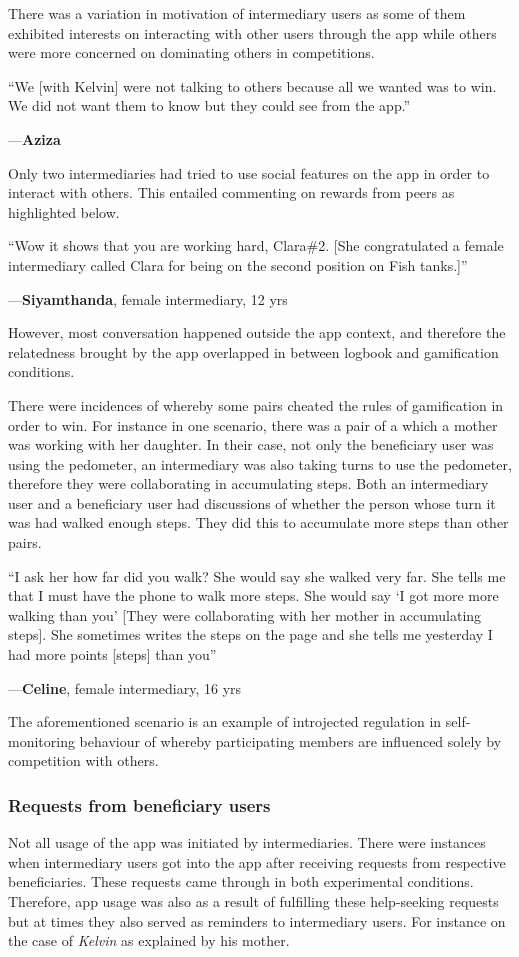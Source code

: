 \documentclass{sig-alternate}
\newenvironment{myquote}
               {\list{}{\rightmargin   \leftmargin
                        \parsep        0in }%
                \item\relax}
               {\endlist}
\newcommand{\userquote}[2]{\begin{samepage}\begin{myquote} 
     \em{\small{#2\begin{flushright}---#1\end{flushright}}}
   \end{myquote}\end{samepage}}
\begin{document}
There was a variation in motivation of intermediary users as some of them exhibited interests on interacting with other users through the app while others were more concerned on dominating others in competitions.

\userquote{\textbf{Aziza}} {``We [with Kelvin] were not talking to others because all we wanted was to win. We did not want them to know but they could see from the app.''}
 
Only two intermediaries had tried to use social features on the app in order to interact with others. This entailed commenting on rewards from peers as highlighted below.


\userquote{\textbf{Siyamthanda}, female intermediary, 12 yrs } {``Wow it shows that you are working hard, Clara\#2. [She congratulated a female intermediary called Clara for being on the second position on Fish tanks.]''} 

However, most conversation happened outside the app context, and therefore the relatedness brought by the app overlapped in between logbook and gamification conditions.

There were incidences of whereby some pairs cheated the rules of gamification in order to win. For instance in one scenario, there was a pair of a which a mother was working with her daughter. In their case, not only the beneficiary user was using the pedometer, an intermediary was also taking turns to use the pedometer, therefore they were collaborating in accumulating steps. Both an intermediary user and a beneficiary user had discussions of whether the person whose turn it was had walked enough steps. They did this to accumulate more steps than other pairs.

\userquote{\textbf{Celine}, female intermediary, 16 yrs} {``I ask her how far did you walk?  She would say she walked very far. She tells me that I must have the phone to walk more steps. She would say `I got more more walking than you' [They were collaborating with her mother in accumulating steps]. She sometimes writes the steps on the page and she tells me yesterday I had more points [steps] than you''}   

The aforementioned scenario is an example of introjected regulation in self-monitoring behaviour of whereby participating members are influenced solely by competition with others.
\subsubsection*{\textbf{Requests from beneficiary users}}
Not all usage of the app was initiated by intermediaries. There were instances when intermediary users got into the app after receiving requests from respective beneficiaries. These requests came through in both experimental conditions. Therefore, app usage was also as a result of fulfilling these help-seeking requests but at times they also served as reminders to intermediary users. For instance on the case of \emph{Kelvin} as explained by his mother.
\end{document}
